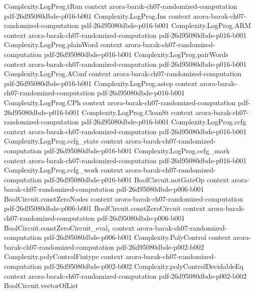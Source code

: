 \begin{theorem}
\proofstep
  {Complexity.LogProg.tRun}
  {context}
  {arora-barak-ch07-randomized-computation}
  {pdf-26d95080dbde-p016-b001}
\proofstep
  {Complexity.LogProg.Ins}
  {context}
  {arora-barak-ch07-randomized-computation}
  {pdf-26d95080dbde-p016-b001}
\proofstep
  {Complexity.LogProg.ARM}
  {context}
  {arora-barak-ch07-randomized-computation}
  {pdf-26d95080dbde-p016-b001}
\proofstep
  {Complexity.LogProg.plainWord}
  {context}
  {arora-barak-ch07-randomized-computation}
  {pdf-26d95080dbde-p016-b001}
\proofstep
  {Complexity.LogProg.pairWords}
  {context}
  {arora-barak-ch07-randomized-computation}
  {pdf-26d95080dbde-p016-b001}
\proofstep
  {Complexity.LogProg.AConf}
  {context}
  {arora-barak-ch07-randomized-computation}
  {pdf-26d95080dbde-p016-b001}
\proofstep
  {Complexity.LogProg.astep}
  {context}
  {arora-barak-ch07-randomized-computation}
  {pdf-26d95080dbde-p016-b001}
\proofstep
  {Complexity.LogProg.CPh}
  {context}
  {arora-barak-ch07-randomized-computation}
  {pdf-26d95080dbde-p016-b001}
\proofstep
  {Complexity.LogProg.CleanSt}
  {context}
  {arora-barak-ch07-randomized-computation}
  {pdf-26d95080dbde-p016-b001}
\proofstep
  {Complexity.LogProg.ccfg}
  {context}
  {arora-barak-ch07-randomized-computation}
  {pdf-26d95080dbde-p016-b001}
\proofstep
  {Complexity.LogProg.ccfg_state}
  {context}
  {arora-barak-ch07-randomized-computation}
  {pdf-26d95080dbde-p016-b001}
\proofstep
  {Complexity.LogProg.ccfg_mark}
  {context}
  {arora-barak-ch07-randomized-computation}
  {pdf-26d95080dbde-p016-b001}
\proofstep
  {Complexity.LogProg.ccfg_work}
  {context}
  {arora-barak-ch07-randomized-computation}
  {pdf-26d95080dbde-p016-b001}
\proofstep
  {BoolCircuit.notGateOp}
  {context}
  {arora-barak-ch07-randomized-computation}
  {pdf-26d95080dbde-p006-b001}
\proofstep
  {BoolCircuit.constZeroNodes}
  {context}
  {arora-barak-ch07-randomized-computation}
  {pdf-26d95080dbde-p006-b001}
\proofstep
  {BoolCircuit.constZeroCircuit}
  {context}
  {arora-barak-ch07-randomized-computation}
  {pdf-26d95080dbde-p006-b001}
\proofstep
  {BoolCircuit.constZeroCircuit_eval₁}
  {context}
  {arora-barak-ch07-randomized-computation}
  {pdf-26d95080dbde-p006-b001}
\proofstep
  {Complexity.PolyControl}
  {context}
  {arora-barak-ch07-randomized-computation}
  {pdf-26d95080dbde-p002-b002}
\proofstep
  {Complexity.polyControlFintype}
  {context}
  {arora-barak-ch07-randomized-computation}
  {pdf-26d95080dbde-p002-b002}
\proofstep
  {Complexity.polyControlDecidableEq}
  {context}
  {arora-barak-ch07-randomized-computation}
  {pdf-26d95080dbde-p002-b002}
\proofstep
  {BoolCircuit.vectorOfList}

\end{theorem}
